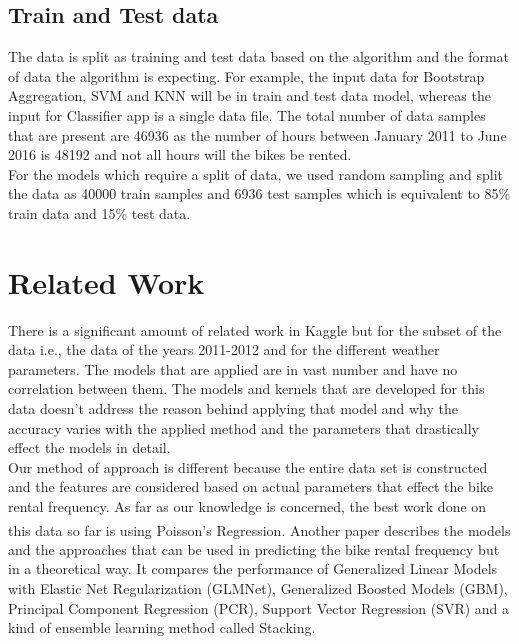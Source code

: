 \documentclass[journal, a4paper]{IEEEtran}
\begin{document}
\subsection{Train and Test data}
The data is split as training and test data based on the algorithm and the format of data the algorithm is expecting. For example, the input data for Bootstrap Aggregation, SVM and KNN will be in train and test data model, whereas the input for Classifier app is a single data file. The total number of data samples that are present are 46936 as the number of hours between January 2011 to June 2016 is 48192 and not all hours will the bikes be rented.\\
\indent For the models which require a split of data, we used random sampling and split the data as 40000 train samples and 6936 test samples which is equivalent to 85\% train data and 15\% test data.

\section{Related Work}
There is a significant amount of related work in Kaggle but for the subset of the data i.e., the data of the years 2011-2012 and for the different weather parameters. The models that are applied are in vast number and have no correlation between them. The models and kernels that are developed for this data doesn't address the reason behind applying that model and why the accuracy varies with the applied method and the parameters that drastically effect the models in detail. \\
\indent Our method of approach is different because the entire data set is constructed and the features are considered based on actual parameters that effect the bike rental frequency. As far as our knowledge is concerned, the best work done on this data so far is using Poisson's Regression\textsuperscript{\cite{relatedworkpoisson}}. Another paper\textsuperscript{\cite{relatedworkmultiple}} describes the models and the approaches that can be used in predicting the bike rental frequency but in a theoretical way. It compares the performance of Generalized Linear Models with Elastic Net Regularization (GLMNet), Generalized Boosted Models (GBM), Principal Component Regression (PCR), Support Vector Regression (SVR) and a kind of ensemble learning method called Stacking.
\end{document}
